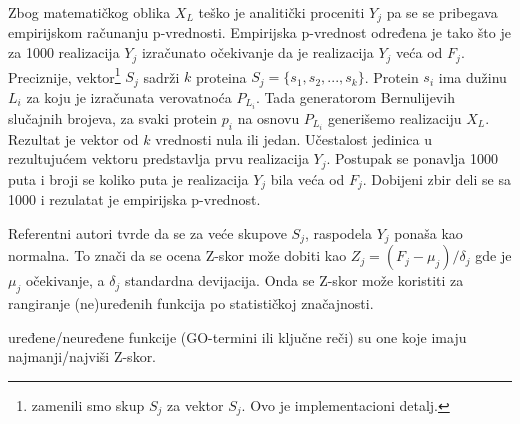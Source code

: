 Zbog matematičkog oblika $X_L$ teško je analitički proceniti $Y_j$ pa se se
pribegava empirijskom računanju p-vrednosti. Empirijska p-vrednost određena je
tako što je za 1000 realizacija $Y_j$ izračunato očekivanje da je realizacija
$Y_j$ veća od $F_j$.
Preciznije, vektor\footnote{zamenili smo skup $S_j$ za vektor $S_j$. Ovo je
implementacioni detalj.} $S_j$ sadrži $k$ proteina $S_j=\{s_1, s_2, ...
,s_{k}\}$.  Protein $s_i$ ima dužinu $L_i$ za koju je izračunata verovatnoća
$P_{L_i}$.  Tada generatorom Bernulijevih slučajnih brojeva, za svaki protein
$p_i$ na osnovu $P_{L_i}$ generišemo realizaciju $X_L$. Rezultat je vektor od
$k$ vrednosti nula ili jedan. Učestalost jedinica u rezultujućem vektoru
predstavlja prvu realizacija $Y_j$.  Postupak se ponavlja 1000 puta i broji
se koliko puta je realizacija $Y_j$ bila veća od $F_j$. Dobijeni zbir deli se
sa 1000 i rezulatat je empirijska p-vrednost.


Referentni autori tvrde da se za veće skupove $S_j$, raspodela
$Y_j$ ponaša kao normalna. To znači da se ocena Z-skor može dobiti kao
$Z_j=(F_j-\mu_j)/\delta_j$ gde je $\mu_j$ očekivanje, a $\delta_j$ standardna
devijacija. Onda se Z-skor može koristiti za rangiranje (ne)uređenih funkcija
po statističkoj značajnosti.
\begin{definicija}
  \label{stat_naj}
   uređene/neuređene funkcije
  (GO-termini ili ključne reči) su one koje imaju najmanji/najviši Z-skor.
\end{definicija}


